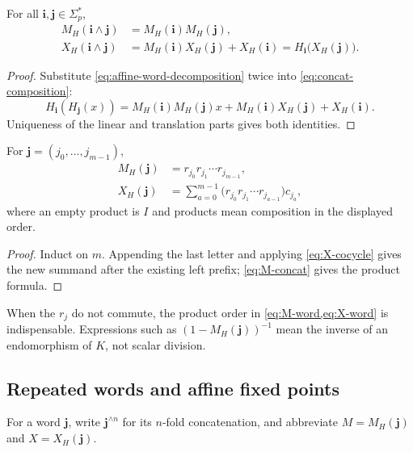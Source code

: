 \begin{proposition}
\label{prop:affine-concatenation}
For all $\mathbf i,\mathbf j\in\Sigma_p^*$,
\begin{align}
 M_H(\mathbf i\wedge\mathbf j)
   &=M_H(\mathbf i)M_H(\mathbf j),\label{eq:M-concat}\\
 X_H(\mathbf i\wedge\mathbf j)
   &=M_H(\mathbf i)X_H(\mathbf j)+X_H(\mathbf i)
     =H_{\mathbf i}\bigl(X_H(\mathbf j)\bigr).
     \label{eq:X-cocycle}
\end{align}
\end{proposition}

\begin{proof}
Substitute \cref{eq:affine-word-decomposition} twice into
\cref{eq:concat-composition}:
\[
 H_{\mathbf i}(H_{\mathbf j}(x))
 =M_H(\mathbf i)M_H(\mathbf j)x
  +M_H(\mathbf i)X_H(\mathbf j)+X_H(\mathbf i).
\]
Uniqueness of the linear and translation parts gives both identities.
\end{proof}

\begin{corollary}
\label{cor:closed-word-formulas}
For $\mathbf j=(j_0,\ldots,j_{m-1})$,
\begin{align}
 M_H(\mathbf j)
   &=r_{j_0}r_{j_1}\cdots r_{j_{m-1}},\label{eq:M-word}\\
 X_H(\mathbf j)
   &=\sum_{a=0}^{m-1}
       \bigl(r_{j_0}r_{j_1}\cdots r_{j_{a-1}}\bigr)c_{j_a},
       \label{eq:X-word}
\end{align}
where an empty product is $I$ and products mean composition in the displayed
order.
\end{corollary}

\begin{proof}
Induct on $m$.  Appending the last letter and applying
\cref{eq:X-cocycle} gives the new summand after the existing left prefix;
\cref{eq:M-concat} gives the product formula.
\end{proof}

When the $r_j$ do not commute, the product order in
\cref{eq:M-word,eq:X-word} is indispensable.  Expressions such as
$(1-M_H(\mathbf j))^{-1}$ mean the inverse of an endomorphism of $K$, not
scalar division.

\subsection{Repeated words and affine fixed points}

For a word $\mathbf j$, write $\mathbf j^{\wedge n}$ for its $n$-fold
concatenation, and abbreviate $M=M_H(\mathbf j)$ and $X=X_H(\mathbf j)$.

